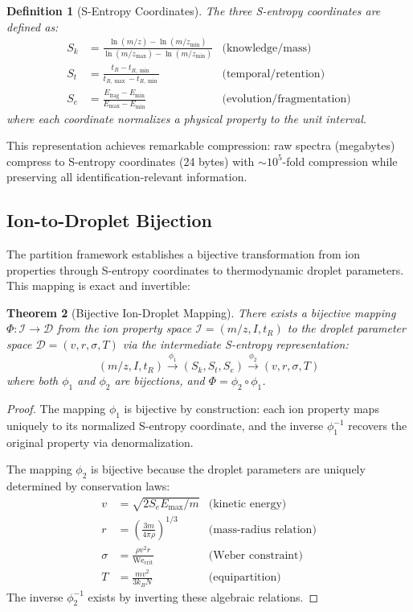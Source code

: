 \documentclass[twocolumn,10pt]{article}
\newtheorem{theorem}{Theorem}[section]
\newtheorem{definition}[theorem]{Definition}
\begin{document}
\begin{definition}[S-Entropy Coordinates]
The three S-entropy coordinates are defined as:
\begin{align}
S_k &= \frac{\ln(m/z) - \ln(m/z_{\min})}{\ln(m/z_{\max}) - \ln(m/z_{\min})} & \text{(knowledge/mass)} \\
S_t &= \frac{t_R - t_{R,\min}}{t_{R,\max} - t_{R,\min}} & \text{(temporal/retention)} \\
S_e &= \frac{E_{\text{frag}} - E_{\min}}{E_{\max} - E_{\min}} & \text{(evolution/fragmentation)}
\end{align}
where each coordinate normalizes a physical property to the unit interval.
\end{definition}

This representation achieves remarkable compression: raw spectra (megabytes) compress to S-entropy coordinates (24 bytes) with $\sim 10^5$-fold compression while preserving all identification-relevant information.

\subsection{Ion-to-Droplet Bijection}

The partition framework establishes a bijective transformation from ion properties through S-entropy coordinates to thermodynamic droplet parameters. This mapping is exact and invertible:

\begin{theorem}[Bijective Ion-Droplet Mapping]
There exists a bijective mapping $\Phi: \mathcal{I} \to \mathcal{D}$ from the ion property space $\mathcal{I} = (m/z, I, t_R)$ to the droplet parameter space $\mathcal{D} = (v, r, \sigma, T)$ via the intermediate S-entropy representation:
\begin{equation}
(m/z, I, t_R) \xrightarrow{\phi_1} (S_k, S_t, S_e) \xrightarrow{\phi_2} (v, r, \sigma, T)
\end{equation}
where both $\phi_1$ and $\phi_2$ are bijections, and $\Phi = \phi_2 \circ \phi_1$.
\end{theorem}

\begin{proof}
The mapping $\phi_1$ is bijective by construction: each ion property maps uniquely to its normalized S-entropy coordinate, and the inverse $\phi_1^{-1}$ recovers the original property via denormalization.

The mapping $\phi_2$ is bijective because the droplet parameters are uniquely determined by conservation laws:
\begin{align}
v &= \sqrt{2 S_e E_{\max} / m} & \text{(kinetic energy)} \\
r &= \left(\frac{3m}{4\pi\rho}\right)^{1/3} & \text{(mass-radius relation)} \\
\sigma &= \frac{\rho v^2 r}{\text{We}_{\text{crit}}} & \text{(Weber constraint)} \\
T &= \frac{m v^2}{3 k_B N} & \text{(equipartition)}
\end{align}
The inverse $\phi_2^{-1}$ exists by inverting these algebraic relations.
\end{proof}
\end{document}
